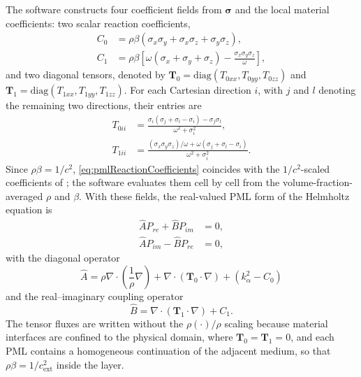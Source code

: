 \documentclass[final,12pt,nopreprintline]{elsarticle}
\newcounter{bla}
\begin{document}
The software constructs four coefficient fields from $\boldsymbol{\sigma}$ and
the local material coefficients: two scalar reaction coefficients,
\begin{equation}
\begin{aligned}
    C_0 &= \rho\beta\left(\sigma_x\sigma_y+\sigma_x\sigma_z+\sigma_y\sigma_z\right),\\
    C_1 &= \rho\beta\left[
        \omega(\sigma_x+\sigma_y+\sigma_z)
        -\frac{\sigma_x\sigma_y\sigma_z}{\omega}
    \right],
\end{aligned}
\label{eq:pmlReactionCoefficients}
\end{equation}
and two diagonal tensors, denoted by
$\mathbf{T}_0=\mathrm{diag}(T_{0xx},T_{0yy},T_{0zz})$ and
$\mathbf{T}_1=\mathrm{diag}(T_{1xx},T_{1yy},T_{1zz})$.
For each Cartesian direction $i$, with $j$ and $l$ denoting the remaining
two directions, their entries are
\begin{equation}
\begin{aligned}
    T_{0ii} &=
    \frac{\sigma_i(\sigma_j+\sigma_l-\sigma_i)-\sigma_j\sigma_l}
    {\omega^2+\sigma_i^2},\\
    T_{1ii} &=
    \frac{(\sigma_x\sigma_y\sigma_z)/\omega
    +\omega(\sigma_j+\sigma_l-\sigma_i)}
    {\omega^2+\sigma_i^2}.
\end{aligned}
\label{eq:pmlTensorCoefficients}
\end{equation}
Since $\rho\beta=1/c^2$, \cref{eq:pmlReactionCoefficients} coincides with the
$1/c^2$-scaled coefficients of \cite{Xu2026HelmholtzPML}; the software
evaluates them cell by cell from the volume-fraction-averaged $\rho$ and
$\beta$.  With these fields, the real-valued PML form of the Helmholtz equation
is
\begin{equation}
\begin{aligned}
    \hat A P_{re} + \hat B P_{im} &= 0, \\
    \hat A P_{im} - \hat B P_{re} &= 0,
\end{aligned}
\label{eq:pmlSplit}
\end{equation}
with the diagonal operator
\begin{equation}
    \hat A =
    \rho\nabla\cdot\left(\frac{1}{\rho}\nabla\right)
    + \nabla\cdot(\mathbf{T}_0\cdot\nabla)
    + (k_\alpha^2-C_0)
    \label{eq:diagonalOperator}
\end{equation}
and the real--imaginary coupling operator
\begin{equation}
    \hat B = \nabla\cdot(\mathbf{T}_1\cdot\nabla)+C_1.
    \label{eq:couplingOperator}
\end{equation}
The tensor fluxes are written without the $\rho(\cdot)/\rho$ scaling because
material interfaces are confined to the physical domain, where
$\mathbf{T}_0=\mathbf{T}_1=0$, and each PML contains a homogeneous
continuation of the adjacent medium, so that $\rho\beta=1/c_{\mathrm{ext}}^2$
inside the layer.
\end{document}
